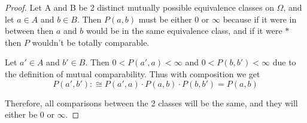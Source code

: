 \documentclass[twoside]{article}
\theoremstyle{plain}%
\theoremstyle{definition}
\theoremstyle{remark}
\begin{document}
\begin{proof}
Let A and B be 2 distinct mutually possible equivalence classes on \(\Omega\), and let \(a \in A\) and \(b \in B\). Then \(P(a, b)\) must be either 0 or \(\infty\) because if it were in between then \(a\) and \(b\) would be in the same equivalence class, and if it were \(\ast\) then \(P\) wouldn't be totally comparable.

Let \(a' \in A\) and \(b' \in B\). Then \(0 < P(a', a) < \infty\) and \(0 < P(b, b') < \infty\) due to the definition of mutual comparability. Thus with composition we get
\[P(a', b') :\cong P(a', a) \cdot P(a, b) \cdot P(b, b') = P(a, b)\]

Therefore, all comparisons between the 2 classes will be the same, and they will either be 0 or \(\infty\).
\end{proof}
\end{document}
